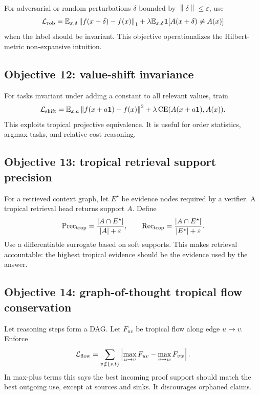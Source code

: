 \documentclass[11pt]{article}
\newcommand{\E}{\mathbb{E}}
\newcommand{\calL}{\mathcal{L}}
\newcommand{\norm}[1]{\left\lVert #1\right\rVert}
\newcommand{\eps}{\varepsilon}
\begin{document}
For adversarial or random perturbations \(\delta\) bounded by \(\norm\delta\le\eps\), use
\begin{equation}
\calL_{\rm rob}=\E_{x,\delta}\norm{f(x+\delta)-f(x)}_1+\lambda\E_{x,\delta}\mathbf{1}[A(x+\delta)\ne A(x)]
\end{equation}
when the label should be invariant.  This objective operationalizes the Hilbert-metric non-expansive intuition.

\subsection{Objective 12: value-shift invariance}

For tasks invariant under adding a constant to all relevant values, train
\begin{equation}
\calL_{\rm shift}=\E_{x,a}\norm{f(x+a{\bf 1})-f(x)}^2+\lambda\operatorname{CE}(A(x+a{\bf 1}),A(x)).
\end{equation}
This exploits tropical projective equivalence.  It is useful for order statistics, argmax tasks, and relative-cost reasoning.

\subsection{Objective 13: tropical retrieval support precision}

For a retrieved context graph, let \(E^\star\) be evidence nodes required by a verifier.  A tropical retrieval head returns support \(A\).  Define
\begin{equation}
\operatorname{Prec}_{\rm trop}=\frac{|A\cap E^\star|}{|A|+\eps},\qquad \operatorname{Rec}_{\rm trop}=\frac{|A\cap E^\star|}{|E^\star|+\eps}.
\end{equation}
Use a differentiable surrogate based on soft supports.  This makes retrieval accountable: the highest tropical evidence should be the evidence used by the answer.

\subsection{Objective 14: graph-of-thought tropical flow conservation}

Let reasoning steps form a DAG.  Let \(F_{uv}\) be tropical flow along edge \(u\to v\).  Enforce
\begin{equation}
\calL_{\rm flow}=\sum_{v\notin\{s,t\}}\left|\max_{u\to v}F_{uv}-\max_{v\to w}F_{vw}\right|.
\end{equation}
In max-plus terms this says the best incoming proof support should match the best outgoing use, except at sources and sinks.  It discourages orphaned claims.
\end{document}
